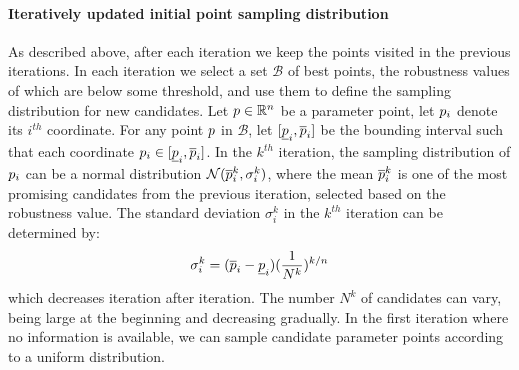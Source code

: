 \paragraph{Iteratively updated initial point sampling distribution}
As described above, after each iteration we keep the points visited in the previous iterations. In each iteration we select a set $\mathcal{B}$ of best points, the robustness values of which are below some threshold, and use them to define the sampling distribution for new candidates. 
Let $p \in \mathbb{R}^n$ be a parameter point, let $p_i$ denote its $i^{th}$ coordinate. For any point $p$ in $\mathcal{B}$, let $[\underline{p}_i, \overline{p}_i]$  be the bounding interval such that each coordinate $p_i \in [\underline{p}_i, \overline{p}_i]$. In the $k^{th}$ iteration, the sampling distribution of $p_i$ can be a normal distribution $\mathcal{N}(\overline{p}^k_i, \sigma_i^k)$, where the mean $\overline{p}^k_i$ is one of the most promising candidates from the previous iteration, selected based on the robustness value. The standard deviation $\sigma_i^k$ in the $k^{th}$ iteration can be determined by: 
\begin{equation} \label{eq:sigma}
\sigma_i^k = (\overline{p}_i - \underline{p}_i) (\frac{1}{N^k})^{k/n}
\end{equation}
which decreases iteration after iteration. The number $N^k$ of candidates can vary, being large at the beginning and decreasing gradually. In the first iteration where no information is available, we can sample candidate parameter points according to a uniform distribution. 


